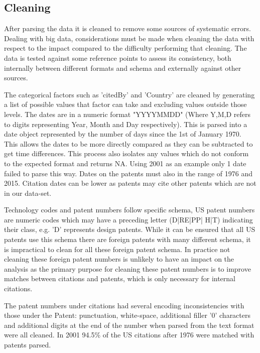 
\subsection{Cleaning} \label{section:Cleaning}

After parsing the data it is cleaned to remove some sources of systematic errors. Dealing with big data, considerations must be made when cleaning the data with respect to the impact compared to the difficulty performing that cleaning. The data is tested against some reference points to assess its consistency, both internally between different formats and schema and externally against other sources. 

The categorical factors such as 'citedBy' and 'Country' are cleaned by generating a list of possible values that factor can take and excluding values outside those levels. The dates are in a numeric format "YYYYMMDD" (Where Y,M,D refers to digits representing Year, Month and Day respectively). This is parsed into a date object represented by the number of days since the 1st of January 1970. This allows the dates to be more directly compared as they can be subtracted to get time differences. This process also isolates any values which do not conform to the expected format and returns NA. Using 2001 as an example only 1 date failed to parse this way. Dates on the patents must also in the range of 1976 and 2015. Citation dates can be lower as patents may cite other patents which are not in our data-set. 

Technology codes and patent numbers follow specific schema, US patent numbers are numeric codes which may have a preceding letter (D|RE|PP| H|T) indicating their class, e.g. 'D' represents design patents. While it can be ensured that all US patents use this schema there are foreign patents with many different schema, it is impractical to clean for all these foreign patent schema. In practice not cleaning these foreign patent numbers is unlikely to have an impact on the analysis as the primary purpose for cleaning these patent numbers is to improve matches between citations and patents, which is only necessary for internal citations.  

The patent numbers under citations had several encoding inconsistencies with those under the Patent: punctuation, white-space, additional filler '0' characters and additional digits at the end of the number when parsed from the text format were all cleaned. In 2001 94.5\% of the US citations after 1976 were matched with patents parsed. 

